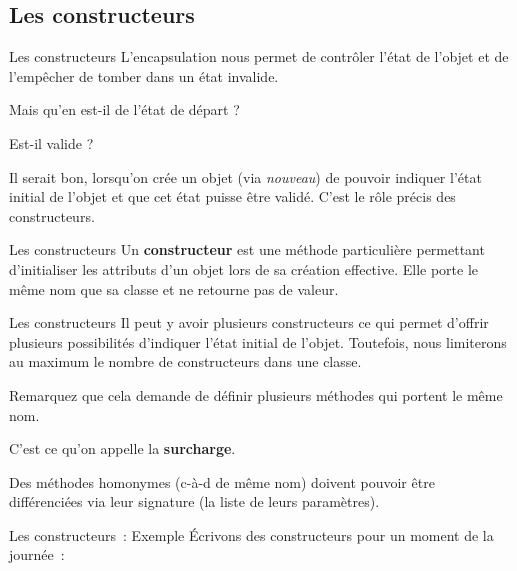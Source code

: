\subsection{Les constructeurs}

\begin{frame}{Les constructeurs}
	L'encapsulation nous permet de contrôler
	l'état de l'objet et de
	l'empêcher de tomber dans un état invalide. 
	
	\bigskip
	
	Mais qu'en est-il de l'état de départ ?
	
	Est-il valide ?
	
	\bigskip
	
	Il serait bon, lorsqu'on crée un objet (via
	\textit{nouveau}) de pouvoir indiquer l'état
	initial de l'objet et que cet état puisse être validé.
	C'est le rôle précis des constructeurs.
\end{frame}

\begin{frame}{Les constructeurs}
	Un \textbf{constructeur} est une méthode particulière permettant
	d'initialiser les attributs d'un
	objet lors de sa création effective. Elle porte le même nom que sa
	classe et ne retourne pas de valeur.
\end{frame}

\begin{frame}{Les constructeurs}
	Il peut y avoir plusieurs constructeurs ce qui permet
	d'offrir plusieurs possibilités d'indiquer l'état initial de
	l'objet. Toutefois, nous limiterons au maximum le nombre 
	de constructeurs dans une classe.
	
	\bigskip
	
	Remarquez que cela demande de définir plusieurs méthodes 
	qui portent le même nom. 
	
	C'est ce qu'on appelle la	\textbf{surcharge}. 
	
	Des méthodes homonymes (c-à-d de même nom) doivent
	pouvoir être différenciées via leur signature (la liste de leurs
	paramètres).
\end{frame}

\begin{frame}{Les constructeurs~: Exemple}
	Écrivons des constructeurs pour un moment de la journée~:

\end{frame}

